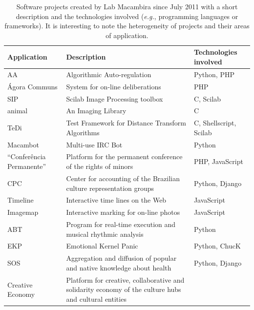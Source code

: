 \documentclass{article}
\newcommand{\eg}{{\it e.g.}}
\begin{document}
\begin{table}
    \caption{Software projects created by Lab Macambira since July
      2011 with a short description and the technologies involved (\eg,
      programming languages or frameworks). It is
      interesting to note the heterogeneity of projects and their areas
      of application.}

    \footnotesize{
    \begin{tabular}{|l|p{5cm}|l|}
        \hline
        Application & Description & Technologies involved \\ 
        \hline \hline
        AA            & Algorithmic Auto-regulation      & Python, PHP \\
        \hline
        \'{A}gora Communs & System for on-line deliberations & PHP \\
        \hline
        SIP           & Scilab Image Processing toolbox & C, Scilab \\
        \hline
        animal        & An Imaging Library              & C \\
        \hline
        TeDi          & Test Framework for Distance Transform
        Algorithms & C, Shellscript, Scilab \\
        \hline
        Macambot      & Multi-use IRC Bot               & Python \\
        \hline
        ``Confer\^{e}ncia Permanente'' & Platform for the permanent
        conference of the rights of minors & PHP, JavaScript \\
        \hline
        CPC           & Center for accounting of the Brazilian culture
        representation groups & Python, Django \\
        \hline
        Timeline      & Interactive time lines on the Web & JavaScript
        \\
        \hline
        Imagemap      & Interactive marking for on-line photos &
        JavaScript \\
        \hline
        ABT           & Program for real-time execution and musical
        rhythmic analysis & Python \\
        \hline
        EKP           & Emotional Kernel Panic & Python, ChucK \\
        \hline
        SOS           & Aggregation and diffusion of popular and native
        knowledge about health & Python, Django \\
        \hline
        Creative Economy & Platform for creative, collaborative and
        solidarity economy of the culture hubs and cultural entities &

\end{tabular}}
\end{table}
\end{document}

